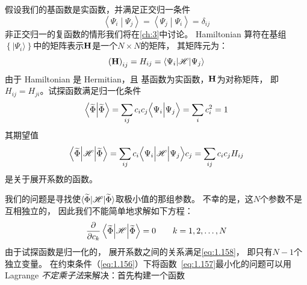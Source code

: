 假设我们的基函数是实函数，并满足正交归一条件
\begin{equation}
 \left\langle\Psi_i\middle\vert\Psi_j\right\rangle = \left\langle\Psi_j\middle\vert\Psi_i\right\rangle = \delta_{ij}
 \label{eq:1.154}
\end{equation}
非正交归一的复函数的情形我们将在\autoref{ch:3}中讨论。
Hamiltonian 算符在基组$\left\{\vert\Psi_i\rangle\right\}$中的矩阵表示$\mathbf{H}$是一个$N\times N$的矩阵，
其矩阵元为：
\begin{equation}
 \left(\mathbf{H}\right)_{ij} = H_{ij} = \left\langle \Psi_i\middle\vert \mathscr{H} \middle\vert \Psi_j\right\rangle
 \label{eq:1.155}
\end{equation}
由于 Hamiltonian 是 Hermitian，且
基函数为实函数，$\mathbf H$为对称矩阵，
即$H_{ij} = H_{ji}$。试探函数满足归一化条件
\begin{equation}
 \left\langle \widetilde\Phi \middle\vert \widetilde\Phi \right\rangle = \sum_{ij} c_i c_j \Big\langle\Psi_i\Big\vert\Psi_j\Big\rangle = \sum_i c_i^2 = 1
 \label{eq:1.156}
\end{equation}
其期望值
\begin{equation}
 \left\langle \widetilde\Phi\middle\vert \mathscr{H} \middle\vert \widetilde\Phi\right\rangle = \sum_{ij}c_i\Big\langle\Psi_i\Big\vert\mathscr{H}\Big\vert\Psi_j\Big\rangle c_j = \sum_{ij}c_ic_jH_{ij}
 \label{eq:1.157}
\end{equation}
是关于展开系数的函数。

我们的问题是寻找使$\langle\widetilde\Phi\vert\mathscr{H}\vert\widetilde\Phi\rangle$取极小值的那组参数。
不幸的是，这$N$个参数不是互相独立的，
因此我们不能简单地求解如下方程：
\begin{equation}
 \frac{\partial}{\partial c_k} \left\langle \widetilde\Phi\middle\vert \mathscr{H} \middle\vert \widetilde\Phi\right\rangle = 0 \qquad k = 1, 2, \dots, N
 \label{eq:1.158}
\end{equation}
由于试探函数是归一化的，
展开系数之间的关系满足\autoref{eq:1.158}，
即只有$N-1$个独立变量。
在约束条件（\autoref{eq:1.156}）下将函数~\eqref{eq:1.157}最小化的问题可以用 Lagrange \emph{不定乘子法}来解决：首先构建一个函数

